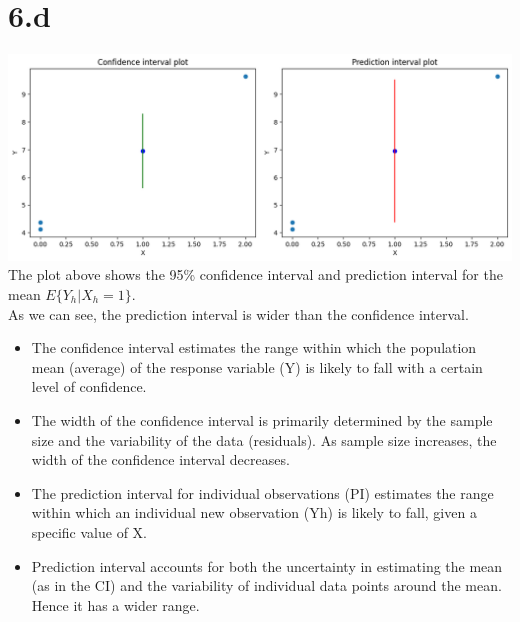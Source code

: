 \documentclass[12pt]{article}
\begin{document}
\newpage
\section*{6.d}
\includegraphics*[width=\linewidth]{graph6d}
The plot above shows the 95\% confidence interval and prediction interval for the
mean \(E\{Y_h|X_h = 1\}\).
\\ As we can see, the prediction interval is wider than the confidence interval.
\begin{itemize}
    \item The confidence interval estimates the range within which the population
    mean (average) of the response variable (Y) is likely to fall
    with a certain level of confidence.
    \item The width of the confidence interval is primarily determined by the
    sample size and the variability of the data (residuals). As sample size increases,
    the width of the confidence interval decreases.
    \item The prediction interval for individual observations (PI) estimates the
    range within which an individual new observation (Yh) is likely to fall,
    given a specific value of X.
    \item Prediction interval accounts for both the uncertainty in estimating the
    mean (as in the CI) and the variability of individual data points around the mean.
    Hence it has a wider range.
\end{itemize}

\newpage
\end{document}
